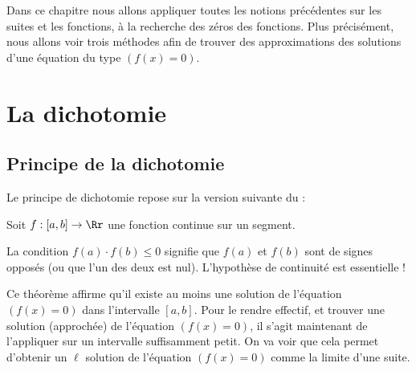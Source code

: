 \documentclass[class=report,crop=false]{standalone}
\begin{document}





\bigskip
\bigskip


Dans ce chapitre nous allons appliquer toutes les notions précédentes sur les suites et les fonctions,
à la recherche des zéros des fonctions. Plus précisément, nous allons voir trois méthodes afin
de trouver des approximations des solutions d'une équation du type $(f(x)=0)$.

\section{La dichotomie}

\subsection{Principe de la dichotomie}

Le principe de dichotomie repose sur la version suivante du  :
\begin{theoreme}
Soit $f:[a,b]\to\Rr$ une fonction continue sur un segment.
\end{theoreme}

La condition $f(a)\cdot f(b)\le0$ signifie que $f(a)$ et $f(b)$
sont de signes opposés (ou que l'un des deux est nul). L'hypothèse de continuité est essentielle !



Ce théorème affirme qu'il existe au moins une solution de l'équation $(f(x)=0)$
dans l'intervalle $[a,b]$. Pour le rendre effectif, et trouver une solution (approchée) de l'équation $(f(x)=0)$,
il s'agit maintenant de l'appliquer sur un intervalle suffisamment petit.
On va voir que cela permet d'obtenir un $\ell$ solution de l'équation $(f(x)=0)$ comme la limite d'une suite.
\end{document}
